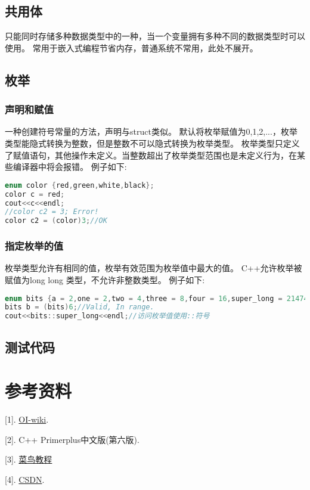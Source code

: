 \documentclass{article}
\begin{document}
    \subsection{共用体}
    只能同时存储多种数据类型中的一种，当一个变量拥有多种不同的数据类型时可以使用。
    常用于嵌入式编程节省内存，普通系统不常用，此处不展开。

    \subsection{枚举}
    \subsubsection{声明和赋值}
    一种创建符号常量的方法，声明与struct类似。
    默认将枚举赋值为0,1,2,...，枚举类型能隐式转换为整数，但是整数不可以隐式转换为枚举类型。
    枚举类型只定义了赋值语句，其他操作未定义。当整数超出了枚举类型范围也是未定义行为，在某些编译器中将会报错。
    例子如下:
    \begin{lstlisting}[language = c++]
enum color {red,green,white,black};
color c = red;
cout<<c<<endl;
//color c2 = 3; Error!
color c2 = (color)3;//OK 
    \end{lstlisting}

    \subsubsection{指定枚举的值}
    枚举类型允许有相同的值，枚举有效范围为枚举值中最大的值。
    C++允许枚举被赋值为long long 类型，不允许非整数类型。
    例子如下:
    \begin{lstlisting}[language=c++]
enum bits {a = 2,one = 2,two = 4,three = 8,four = 16,super_long = 2147483649L};//可声明为long long.
bits b = (bits)6;//Valid, In range.
cout<<bits::super_long<<endl;//访问枚举值使用::符号
    \end{lstlisting}

    \subsection{测试代码}
    

    \section*{参考资料}
    [1]. \href{https://OI-wiki.org}{OI-wiki}.

    [2]. C++ Primerplus中文版(第六版).

    [3]. \href{https://www.runoob.com/note/26809}{菜鸟教程}

    [4]. \href{https://blog.csdn.net/}{CSDN}.
\end{document}
